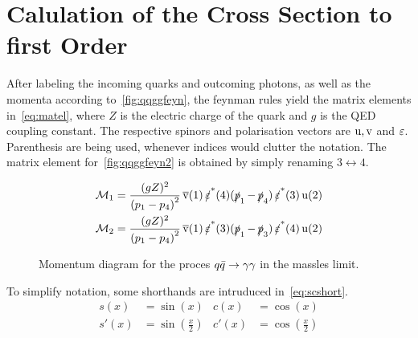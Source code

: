 
\section{Calulation of the Cross Section to first Order}%
\label{sec:qqggcalc}

After labeling the incoming quarks and outcoming photons, as well as
the momenta according to~\ref{fig:qqggfeyn}, the feynman rules yield
the matrix elements in~\eqref{eq:matel}, where \(Z\) is the electric
charge of the quark and \(g\) is the QED coupling constant. The
respective spinors and polarisation vectors are \(\operatorname{u},\operatorname{v}\) and
\(\operatorname{\varepsilon}\). Parenthesis are being used, whenever indices would clutter
the notation. The matrix element for~\ref{fig:qqggfeyn2} is obtained
by simply renaming \(3\leftrightarrow 4\).

\begin{align}
  \label{eq:matel}
  \mathcal{M}_1 &= \frac{(gZ)^2}{\qty(p_1 - p_4)^2}\vsb(1)\pses(4)(\ps_1 -
                \ps_4)\pses(3)\us(2)\\
  \mathcal{M}_2 &= \frac{(gZ)^2}{\qty(p_1 - p_4)^2}\vsb(1)\pses(3)(\ps_1 - \ps_3)\pses(4)\us(2)
\end{align}

\begin{wrapfigure}{R}{0.4\textwidth}
\centering
{}
\caption{\label{fig:qqimpulses} Momentum diagram for the proces
  \(q\bar{q}\rightarrow\gamma\gamma\) in the massles limit.}
\end{wrapfigure}


To simplify notation, some shorthands are intruduced
in~\eqref{eq:scshort}.
\begin{equation}
  \label{eq:scshort}
  \begin{split}
    s(x) &= \sin(x) & c(x) &= \cos(x) \\ s'(x) &= \sin(\frac{x}{2}) & c'(x) &= \cos(\frac{x}{2})
  \end{split}
\end{equation}

